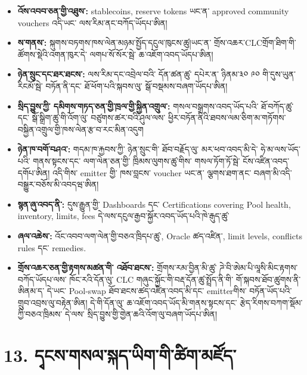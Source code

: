 \documentclass[11pt]{article}
\begin{document}
\begin{itemize}[leftmargin=*]
\item \textbf{འོས་འབབ་ཅན་གྱི་འཐུས་:} stablecoins, reserve tokens ཡང་ན་ approved community vouchers འདི་ཡང་ ལས་རིམ་ནང་བཀོད་ཡོདཔ་ཨིན།
\item \textbf{ས་གནས་:} སྐུགས་བཏགས་ཁས་ལེན་མཉམ་སྤྱོད་དངུལ་ཁུངས་ཚུ།ཡང་ན་ གྲོས་འཆར་CLCགྲོག་ཐིག་གི་ཚོགས་སྡེའི་འགན་ཁུར་དེ་ ལགཔ་སོ་སོར་སྦེ་ ཆ་འཇོག་འབད་ཡོདཔ་ཨིན།
\item \textbf{ཉེན་སྲུང་དང་ཐར་ཐངས་:} ལས་རིམ་དང་འབྲེལ་བའི་ དོན་ཚན་ཚུ་ དཔེར་ན་ ཉིནམ་༣༠ ༩༠ གི་དུས་ཡུན་རིངམོ་སྦེ་ བཏོན་ནི་དང་ ཐོ་ཕོག་པའི་སྐབས་ལུ་ སྒོ་བསྡམས་བཞག་ཡོདཔ་ཨིན།
\item \textbf{སྲིད་བྱུས་ཀྱི་ དམིགས་གཏད་ཅན་གྱི་ཁྲལ་གྱི་སྐྱིན་འགྲུལ་:} གསལ་བསྒྲགས་འབད་ཡོད་པའི་ ཐོ་བཀོད་ཚུ་དང་ སྒོ་སྒྲིག་ཚུ་གི་འོག་ལུ་ བཙུགས་ཚར་བའི་ཤུལ་ལས་ ཕྱིར་བཏོན་ནིའི་ཐབས་ལམ་ཅིག་མ་གཏོགས་ བསྐྱིན་འགྲུལ་གྱི་ཁས་ལེན་རྩ་བ་རང་མིན་འདུག
\item \textbf{ཉེན་ཁ་བགོ་བཤའ་:} གདམ་ཁ་རྐྱབས་ཀྱི་ ཉེན་སྲུང་གི་ ཐོབ་བརྗོད་ལུ་ མར་ཕབ་འབད་མི་དེ་ ཧེ་མ་ལས་ཡོད་པའི་ གནས་སྟངས་དང་ ལག་ལེན་ཅན་གྱི་ ཁྲིམས་ལུགས་ཚུ་གིས་ གསལ་ཏོག་ཏོ་སྦེ་ ངོས་འཛིན་འབད་དགོཔ་ཨིན། འདི་གིས་ emitter གྱི་ ཁས་བླངས་ voucher ཡང་ན་ ལྕགས་ཐག་ནང་ བཞག་མི་འདི་ བསྒྱུར་བཅོས་མི་འབདཝ་ཨིན།
\item \textbf{སྙན་ཞུ་འབད་ནི་:} དུས་རྒྱུན་གྱི་ Dashboards དང་ Certifications covering Pool health, inventory, limits, fees དེ་ལས་དངུལ་རྒྱབ་སྐྱོར་འབད་ཡོད་པའི་ཁེ་རྒུད་ཚུ་
\item \textbf{ཞལ་འཆེས་:} འོང་འབབ་ལག་ལེན་གྱི་བཅའ་ཁྲིདཔ་ཚུ་, Oracle ཚད་འཛིན་, limit levels, conflicts rules དང་ remedies.
\item \textbf{གྲོས་འཆར་ཅན་གྱི་རྟགས་མཚན་གི་ འཐོབ་ཐངས་:} གྲོགས་རམ་བྱིན་མི་ཚུ་ ཌེ་བི་ཨེམ་པི་ལཱསི་མིང་རྟགས་བཀོད་ཡོདཔ་ལས་ ཁོང་རའི་དོན་ལུ་ CLC གཞུང་སྐྱོང་གི་བརྡ་དོན་ཚུ་སྤྲོད་ནི་གི་ གོ་སྐབས་ཐོབ་ཚུགས་ནི་ཨིནམ་ད་ དེ་ཡང་ Pool-swap ཐོབ་ཐངས་ཚད་འཛིན་འབད་མི་དང་ emitterགིས་ བཏོན་ཡོད་པའི་གྲུབ་འབྲས་ལུ་བརྟེན་ཨིན། དེ་གི་དོན་ལུ་ ཆ་འཇོག་འབད་ཡོད་མི་གནས་སྟངས་དང་ རྩེད་རིགས་བཀག་སྡོམ་ཀྱི་བཅའ་ཁྲིམས་ དེ་ལས་ སྲིད་བྱུས་གྱི་གྱེན་ཆའི་འོག་ལུ་བཞག་ཡོདཔ་ཨིན།
\end{itemize}


\section*{13. དྭངས་གསལ་སྐད་ཡིག་གི་ཚིག་མཛོད་}
\end{document}
